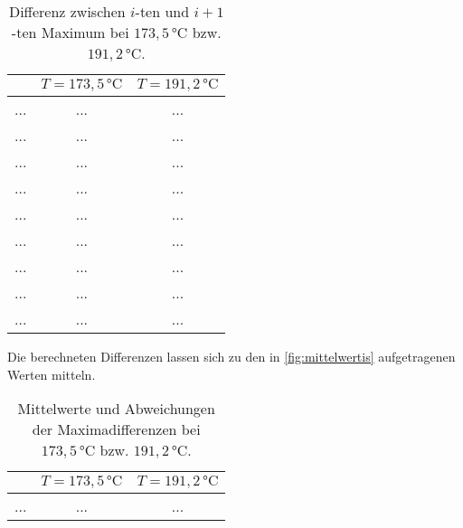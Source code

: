 \begin{table}[H]
    \centering
    \caption{Differenz zwischen $i$-ten und $i + 1$-ten Maximum bei $173,5 \,\unit{\celsius}$ bzw. $191,2 \,\unit{\celsius}$.}
    \label{tab:messung2}
    \begin{tabular}{S[table-format = 1.1] S[table-format = 2.3] S[table-format = 2.3]}
      \toprule
      {} & {$T = 173,5 \,\unit{\celsius}$} & {$T = 191,2 \,\unit{\celsius}$}\\
      \midrule
        {...}               &           {...}           &           {...}           \\
        {...}               &           {...}           &           {...}           \\
        {...}               &           {...}           &           {...}           \\
        {...}               &           {...}           &           {...}           \\
        {...}               &           {...}           &           {...}           \\
        {...}               &           {...}           &           {...}           \\
        {...}               &           {...}           &           {...}           \\
        {...}               &           {...}           &           {...}           \\
        {...}               &           {...}           &           {...}           \\
      \bottomrule
    \end{tabular}
\end{table}

Die berechneten Differenzen lassen sich zu den in \autoref{fig:mittelwertis} aufgetragenen Werten mitteln.

\begin{table}[H]
    \centering
    \caption{Mittelwerte und Abweichungen der Maximadifferenzen bei $173,5 \,\unit{\celsius}$ bzw. $191,2 \,\unit{\celsius}$.}
    \label{tab:messung2}
    \begin{tabular}{S[table-format = 1.1] S[table-format = 2.3] S[table-format = 2.3]}
      \toprule
      {} & {$T = 173,5 \,\unit{\celsius}$} & {$T = 191,2 \,\unit{\celsius}$}\\
      \midrule
        {...}               &           {...}           &           {...}           \\
      \bottomrule
    \end{tabular}
\end{table}

